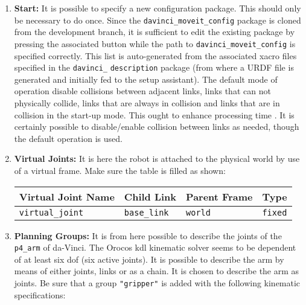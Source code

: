\begin{enumerate}
\item \textbf{Start:} It is possible to specify a new configuration package. This should only be necessary to do once. Since the \texttt{davinci\_moveit\_config} package is cloned from the development branch, it is sufficient to edit the existing package by pressing the associated button while the path to \texttt{davinci\_moveit\_config} is specified correctly.
This list is auto-generated from the associated xacro files specified in the \texttt{davinci\_} \texttt{description} package (from where a URDF file is generated and initially fed to the setup assistant). The default mode of operation disable collisions between adjacent links, links that can not physically collide, links that are always in collision and links that are in collision in the start-up mode. This ought to enhance processing time \citep{bib:setup_assistant}. It is certainly possible to disable/enable collision between links as needed, though the default operation is used.	
\item \textbf{Virtual Joints:} It is here the robot is attached to the physical world by use of a virtual frame. Make sure the table is filled as shown:
\begin{table}[H]
\hspace{1cm}\begin{tabular}{l|l|l|l}
\textbf{Virtual Joint Name} & \textbf{Child Link}  & \textbf{Parent Frame}  & \textbf{Type}   \\
\hline
 \texttt{virtual\_joint} & \texttt{base\_link}  & \texttt{world}  &  \texttt{fixed} \\
\end{tabular}
\end{table}
\item \textbf{Planning Groups:} It is from here possible to describe the joints of the \texttt{p4\_arm} of da-Vinci. The Orocos \gls{kdl} kinematic solver seems to be dependent of at least six \gls{dof} (six active joints). It is possible to describe the arm by means of either joints, links or as a chain. It is chosen to describe the arm as joints. Be sure that a group \texttt{"gripper"} is added with the following kinematic specifications:

\end{enumerate}
